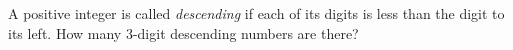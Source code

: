 A positive integer is called \emph{descending} if each of its digits is less than the digit to its left. How many $3$-digit descending numbers are there?
